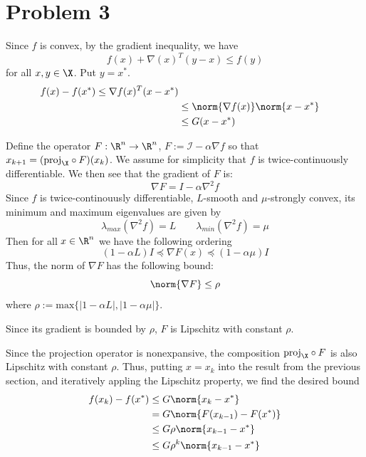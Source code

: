 \documentclass{homework}
\begin{document}
\section{Problem 3}
\begin{letterenum}
    \item Since $f$ is convex, by the gradient inequality, we have
    \begin{equation}
        f(x) + \nabla(x)^T(y-x) \leq f(y)
    \end{equation}
    for all $x,y\in\X$. Put $y=x^*$.
    \begin{align*}
        f(x) - f(x^*) \leq \nabla f(x)^T (x - x^*) \\
            &\leq \norm{\nabla f(x)} \norm{x - x^*} \\
            &\leq G(x - x^*)
    \end{align*}

    \item Define the operator $F: \R^n \to \R^n$,
    $F := \mathcal{I} - \alpha \nabla f$ so that
    $x_{k+1} = (\text{proj}_{\X} \circ F) (x_k)$. We assume for simplicity
    that $f$ is twice-continuously differentiable. We then see that the
    gradient of $F$ is:
    \begin{equation}
        \nabla F = I - \alpha \nabla^2 f
    \end{equation}
    Since $f$ is twice-continouusly differentiable, $L$-smooth and $\mu$-strongly
    convex, its minimum and maximum eigenvalues are given by
    \begin{equation}
        \lambda_{max}(\nabla^2 f) = L \qquad \lambda_{min}(\nabla^2 f) = \mu
    \end{equation}
    Then for all $x \in \R^n$ we have the following ordering
    \begin{equation}
        (1 - \alpha L) I \preceq \nabla F(x) \preceq (1 - \alpha \mu) I
    \end{equation}
    Thus, the norm of $\nabla F$ has the following bound:
    \begin{equation}
        \norm{\nabla F} \leq \rho
    \end{equation}
    where $\rho := \text{max}\{ |1 - \alpha L|, | 1 - \alpha \mu | \}$.
    
    Since its gradient is bounded by $\rho$, $F$ is Lipschitz with constant $\rho$.

    Since the projection operator is nonexpansive, the composition
    $\text{proj}_{\X} \circ F$ is also Lipschitz with constant $\rho$. Thus,
    putting $x = x_k$ into the result from the previous section, and 
    iteratively appling the Lipschitz property, we find the desired bound
    \begin{align*}
        f(x_k) - f(x^*) &\leq G \norm{x_k - x^*} \\
            &= G \norm{F(x_{k-1}) - F(x^*)} \\
            &\leq G \rho \norm{x_{k-1} - x^*} \\
            &\leq G \rho^k \norm{x_{k-1} - x^*}
    \end{align*}
\end{letterenum}
\end{document}
